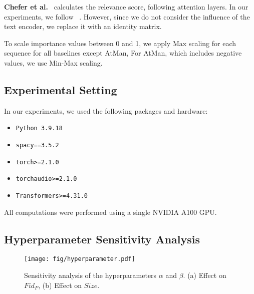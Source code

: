 \textbf{Chefer et al.}~\cite{chefer2021generic} calculates the relevance score, following attention layers. In our experiments, we follow ~\cite{chefer2021generic}. However, since we do not consider the influence of the text encoder, we replace it with an identity matrix.

To scale importance values between 0 and 1, we apply Max scaling for each sequence for all baselines except AtMan, For AtMan, which includes negative values, we use Min-Max scaling.


\subsection{Experimental Setting}
In our experiments, we used the following packages and hardware:

\begin{itemize}
    \item \texttt{Python 3.9.18}
    \item \texttt{spacy==3.5.2}
    \item \texttt{torch>=2.1.0}
    \item \texttt{torchaudio>=2.1.0}
    \item \texttt{Transformers>=4.31.0}
\end{itemize}

All computations were performed using a single NVIDIA A100 GPU.

\subsection{Hyperparameter Sensitivity Analysis}
\begin{figure}
    \center
    \texttt{[image: fig/hyperparameter.pdf]}
    \caption{Sensitivity analysis of the hyperparameters $\alpha$ and $\beta$. (a) Effect on $Fid_{F}$, (b) Effect on $Size$.}
    \label{hyper}
\end{figure}


